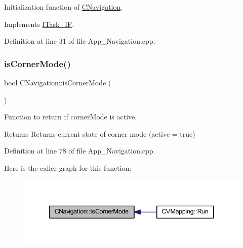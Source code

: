 Initialization function of \mbox{\hyperlink{class_c_navigation}{C\+Navigation}}. 



Implements \mbox{\hyperlink{class_i_task___i_f_a28f608bdb9b19658403f7b9b7421968d}{I\+Task\+\_\+\+IF}}.



Definition at line 31 of file App\+\_\+\+Navigation.\+cpp.

\mbox{\label{class_c_navigation_aa984fc062deefed13a85d866d997de73}} 
\subsubsection{\texorpdfstring{is\+Corner\+Mode()}{isCornerMode()}}
{\footnotesize\ttfamily bool C\+Navigation\+::is\+Corner\+Mode (\begin{DoxyParamCaption}{ }\end{DoxyParamCaption})}



Function to return if corner\+Mode is active. 

\begin{DoxyReturn}{Returns}
Returns current state of corner mode (active = true) 
\end{DoxyReturn}


Definition at line 78 of file App\+\_\+\+Navigation.\+cpp.

Here is the caller graph for this function\+:
\nopagebreak
\begin{figure}[H]
\begin{center}
\leavevmode
\includegraphics[width=340pt]{class_c_navigation_aa984fc062deefed13a85d866d997de73_icgraph}
\end{center}
\end{figure}
\mbox{\label{class_c_navigation_a27649dc6324360829d42aea67e88e3ee}} 
